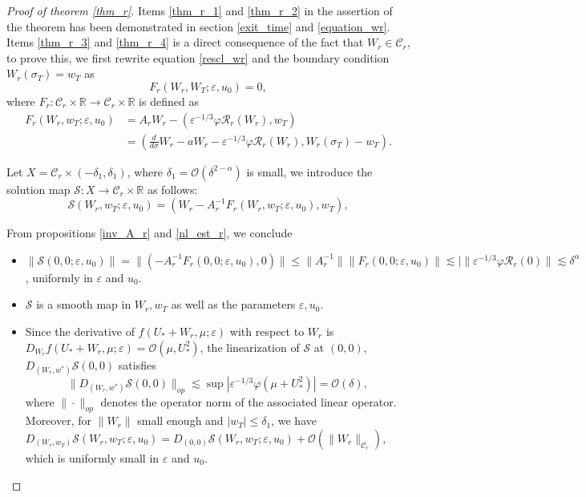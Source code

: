 \documentclass[letterpaper,11pt]{article}
\newcommand{\Ral}{\mathcal{R}}
\newcommand{\rmO}{\mathcal{O}}
\newcommand{\eps}{\varepsilon}
\newcommand{\lar}{ \lesssim }
\numberwithin{equation}{section}
\theoremstyle{plain}
\begin{document}
\begin{proof}[Proof of theorem \ref{thm_r}]
Items \ref{thm_r_1} and \ref{thm_r_2} in the assertion of the theorem has been demonstrated in section \ref{exit_time} and \ref{equation_wr}. Items \ref{thm_r_3} and \ref{thm_r_4} is a direct consequence of the fact that $W_r \in \mathcal{C}_r$, to prove this, we first rewrite equation \eqref{rescl_wr} and the boundary condition $W_r(\sigma_T)=w_T$ as 
\[
F_r(W_r, W_T; \eps, u_0) = 0,
\]
where $F_r : \mathcal{C}_r\times \mathbb{R} \to \mathcal{C}_r\times \mathbb{R}$ is defined as
\begin{align*}
F_r(W_r,w_T;\eps,u_0) &= A_rW_r - \left(\eps^{-1/3}\varphi \Ral_r(W_r), w_T \right)\\
&=\left( \frac{d}{d\sigma}W_r-aW_r - \eps^{-1/3}\varphi \Ral_r(W_r), W_r(\sigma_T)-w_T \right).
\end{align*} 


Let $X = \mathcal{C}_r \times (-\delta_1,
\delta_1)$, where $\delta_1 = \rmO(\delta^{2-\alpha})$ is small, we introduce the solution map $\mathcal{S}: X \to \mathcal{C}_r\times \mathbb{R}$ as follows:
\[
\mathcal{S}(W_r,w_T; \eps, u_0) = (W_r-A_r^{-1}F_r(W_r,w_T;\eps, u_0), w_T),
\]

From propositions \ref{inv_A_r} and \ref{nl_est_r}, we conclude 
\begin{itemize}
\item $\|\mathcal{S}(0,0;\eps,u_0) \|= \|\left( -A_r^{-1}F_r(0,0;\eps,u_0),0\right)\| \le \|A_r^{-1}\|\|F_r(0,0;\eps,u_0)\| \lar |\|\eps^{-1/3}\varphi \Ral_r(0)\| \lar \delta^\alpha$, uniformly in $\eps$ and $u_0$.

\item $\mathcal{S}$ is a smooth map in $W_r,w_T$ as well as the parameters $\eps, u_0$.

\item Since the derivative of $f(U_*+W_r,\mu;\eps)$ with respect to $W_r$ is $D_{W_r} f(U_*+W_r,\mu;\eps)=\rmO(\mu, U_*^2)$, the linearization of $\mathcal{S}$ at $(0,0)$, $D_{(W_r,w^*)} \mathcal{S}(0,0)$ satisfies
\[
\|D_{(W_r,w^*)} \mathcal{S}(0,0)\|_{op} \lar \sup|\eps^{-1/3}\varphi(\mu+U_*^2)| = \rmO(\delta),
\]
where $\|\cdot\|_{op}$ denotes the operator norm of the associated linear operator.
Moreover, for $\|W_r\|$ small enough and $|w_T|\le \delta_1$, we have $D_{(W_r,w_T)}\mathcal{S}(W_r,w_T;\eps,u_0) =  D_{(0,0)}\mathcal{S}(W_r,w_T;\eps,u_0)+\rmO(\|W_r\|_{\mathcal{C}_r})$, which is uniformly small in $\eps$ and $u_0$.


\end{itemize}
\end{proof}
\end{document}

